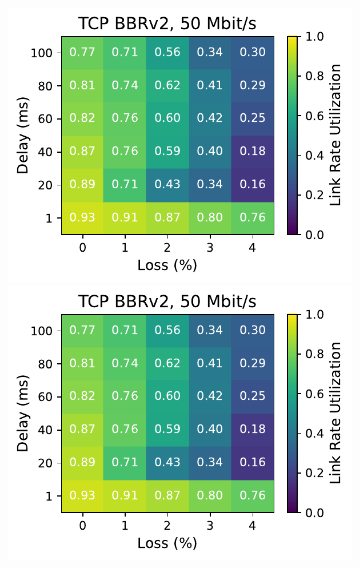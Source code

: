 \begin{figure}[ht]
\begin{subfigure}[b]{0.89cm}
        \includegraphics[width=\linewidth,trim={8cm 0 0 0},clip]{splitting-paper/figures/heatmaps/heatmap_tcp_bbr2_50mbps.pdf}
        \includegraphics[width=\linewidth,trim={8cm 0 0 0},clip]{splitting-paper/figures/heatmaps/heatmap_tcp_bbr2_50mbps.pdf}

\end{subfigure}
\end{figure}
